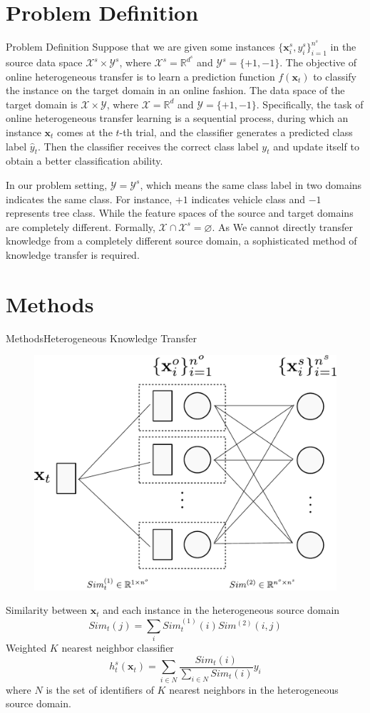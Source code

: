 \documentclass{beamer}
\begin{document}
\section{Problem Definition}
\begin{frame}{Problem Definition}
Suppose that we are given some instances $\{\mathbf{x}_{i}^{s}, y_{i}^{s}\}_{i=1}^{n^s}$ in the source data space $\mathcal{X}^{s} \times \mathcal{Y}^{s}$, where $\mathcal{X}^{s} = \mathbb{R}^{d^s}$ and $\mathcal{Y}^{s} = \{+1,-1\}$.
The objective of online heterogeneous transfer is to learn a prediction function $f(\mathbf{x}_{t})$ to classify the instance on the target domain in an online fashion.
The data space of the target domain is $\mathcal{X} \times \mathcal{Y}$, where $\mathcal{X} = \mathbb{R}^{d}$ and $\mathcal{Y} = \{+1,-1\}$.
Specifically, the task of online heterogeneous transfer learning is a sequential process, during which an instance $\mathbf{x}_t$ comes at the $t$-th trial, and the classifier generates a predicted class label $\hat{y}_{t}$.
Then the classifier receives the correct class label $y_t$ and update itself to obtain a better classification ability.

In our problem setting, $\mathcal{Y} = \mathcal{Y}^{s}$, which means the same class label in two domains indicates the same class.
For instance, $+1$ indicates vehicle class and $-1$ represents tree class.
While the feature spaces of the source and target domains are completely different.
Formally, $\mathcal{X} \cap \mathcal{X}^{s} = \varnothing$.
As We cannot directly transfer knowledge from a completely different source domain, a sophisticated method of knowledge transfer is required.
\end{frame}

\section{Methods}
\begin{frame}{Methods}{Heterogeneous Knowledge Transfer}
\begin{figure}
\centering
\includegraphics[height=0.15\textwidth]{knowledgetransfer.pdf}
\end{figure}
Similarity between $\mathbf{x}_t$ and each instance in the heterogeneous source domain
$$ Sim_t(j) = \sum\limits_i Sim_{t}^{(1)}(i) Sim^{(2)}(i,j) $$
Weighted $K$ nearest neighbor classifier
$$ h_{t}^{s}(\mathbf{x}_t) = \sum\limits_{i \in N} \frac{Sim_t(i)}{\sum\limits_{i \in N} Sim_t(i)} y_i $$
where $N$ is the set of identifiers of $K$ nearest neighbors in the heterogeneous source domain.
\end{frame}
\end{document}
